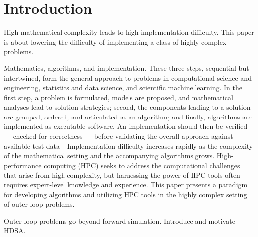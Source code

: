
\section{Introduction}

\begin{purpose}
High mathematical complexity leads to high implementation difficulty.
This paper is about lowering the difficulty of implementing a class of highly complex problems.
\end{purpose}

\noindent
Mathematics, algorithms, and implementation.
These three steps, sequential but intertwined, form the general approach to problems in computational science and engineering, statistics and data science, and scientific machine learning.
In the first step, a problem is formulated, models are proposed, and mathematical analyses lead to solution strategies; second, the components leading to a solution are grouped, ordered, and articulated as an algorithm; and finally, algorithms are implemented as executable software.
An implementation should then be verified --- checked for correctness --- before validating the overall approach against available test data~\cite{oden2004verification,oden2002estimation}.
Implementation difficulty increases rapidly as the complexity of the mathematical setting and the accompanying algorithms grows.
High-performance computing (HPC) seeks to address the computational challenges that arise from high complexity, but harnessing the power of HPC tools often requires expert-level knowledge and experience.
This paper presents a paradigm for developing algorithms and utilizing HPC tools in the highly complex setting of outer-loop problems.

\begin{purpose}
Outer-loop problems go beyond forward simulation. Introduce and motivate HDSA.
\end{purpose}

